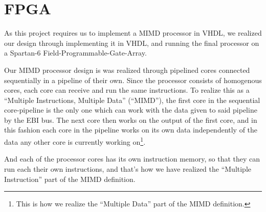\FloatBarrier
\chapter{FPGA}\label{chapter:fpga}

As this project requires us to implement a MIMD processor in VHDL, we realized
our design through implementing it in VHDL, and running the final processor on a
Spartan-6\cite{fpga-chip} Field-Programmable-Gate-Array.

Our MIMD processor design is was realized through pipelined cores connected
sequentially in a pipeline of their own. Since the processor consists of
homogenous cores, each core can receive and run the same instructions. To
realize this as a ``Multiple Instructions, Multiple Data'' (``MIMD''), the first
core in the sequential core-pipeline is the only one which can work with the
data given to said pipeline by the EBI bus. The next core then works on the
output of the first core, and in this fashion each core in the pipeline works on
its own data independently of the data any other core is currently working
on\footnote{This is how we realize the ``Multiple Data'' part of the MIMD
definition.}.

And each of the processor cores has its own instruction memory, so that they can
run each their own instructions, and that's how we have realized the ``Multiple
Instruction'' part of the MIMD definition.
\newpage







